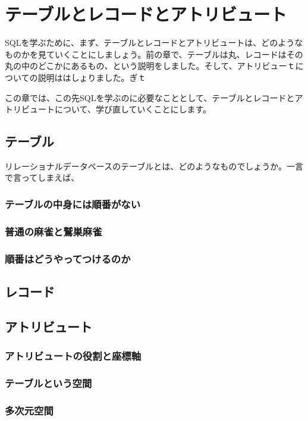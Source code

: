 \chapter{テーブルとレコードとアトリビュート}

SQLを学ぶために、まず、テーブルとレコードとアトリビュートは、どのようなものかを見ていくことにしましょう。前の章で、テーブルは丸、レコードはその丸の中のどこかにあるもの、という説明をしました。そして、アトリビューｔについての説明ははしょりました。ぎｔ

この章では、この先SQLを学ぶのに必要なこととして、テーブルとレコードとアトリビュートについて、学び直していくことにします。


\section{テーブル}

リレーショナルデータベースのテーブルとは、どのようなものでしょうか。一言で言ってしまえば、

\subsection{テーブルの中身には順番がない}



\subsection{普通の麻雀と鷲巣麻雀}

\subsection{順番はどうやってつけるのか}

\section{レコード}

\section{アトリビュート}

\subsection{アトリビュートの役割と座標軸}

\subsection{テーブルという空間}

\subsection{多次元空間}